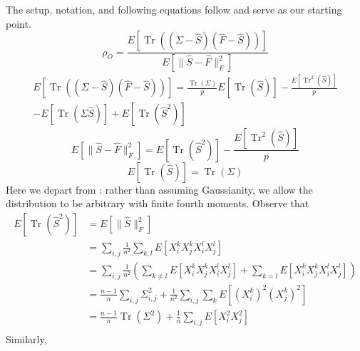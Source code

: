 \documentclass[10pt,twoside,titlepage]{article}
\begin{document}
The setup, notation, and following equations follow \cite{OAS} and serve as our starting point.
\begin{equation}
\rho_O = \frac{ E \left[ \operatorname{Tr} \left( \left( \Sigma - \hat{S} \right) \left( \hat{F} - \hat{S} \right) \right) \right] }{ E \left[ \lVert \hat{S} - \hat{F} \rVert_F^2 \right] }
\end{equation}
\begin{multline}
E \left[ \operatorname{Tr} \left( \left( \Sigma - \hat{S} \right) \left( \hat{F} - \hat{S} \right) \right) \right] =
\frac{\operatorname{Tr}( \Sigma )}{p} E \left[ \operatorname{Tr}(\hat{S})\right]
- \frac{ E \left[ \operatorname{Tr}^2(\hat{S})\right] }{ p } \\
- E \left[ \operatorname{Tr}(\Sigma \hat{S})\right]
+ E \left[ \operatorname{Tr}(\hat{S}^2)\right]
\end{multline}
\begin{equation}
E \left[ \lVert \hat{S} - \hat{F} \rVert_F^2 \right] =
E \left[ \operatorname{Tr}(\hat{S}^2)\right]
- \frac{ E \left[ \operatorname{Tr}^2(\hat{S})\right] }{ p }
\end{equation}
\begin{equation}
E \left[ \operatorname{Tr}(\hat{S})\right] = \operatorname{Tr}(\Sigma)
\end{equation}
Here we depart from \cite{OAS}: rather than assuming Gaussianity, we allow the
distribution to be arbitrary with finite fourth moments.
Observe that
\begin{equation*}
\begin{aligned}
E \left[ \operatorname{Tr}(\hat{S}^2)\right] &= E \left[ \lVert \hat{S} \rVert_F^2 \right] \\
&= \sum_{i,j} \frac{1}{n^2} \sum_{k,l} E \left[ X_i^k X_j^k X_i^l X_j^l \right] \\
&= \sum_{i,j} \frac{1}{n^2} \left( \sum_{k \neq l} E \left[ X_i^k X_j^k X_i^l X_j^l \right] + \sum_{k = l} E \left[ X_i^k X_j^k X_i^l X_j^l \right] \right) \\
&= \frac{n-1}{n} \sum_{i,j} \Sigma^2_{i,j} + \frac{1}{n^2} \sum_{i,j} \sum_k E \left[ (X_i^k)^2 (X_j^k)^2 \right] \\
&= \frac{n-1}{n} \operatorname{Tr}(\Sigma^2) + \frac{1}{n} \sum_{i,j} E \left[ X_i^2 X_j^2 \right] \\
\end{aligned}
\end{equation*}
Similarly,
\end{document}
